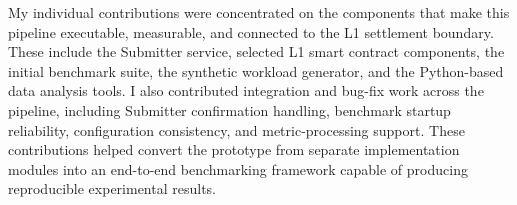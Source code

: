 My individual contributions were concentrated on the components that make this pipeline executable, measurable, and connected to the L1 settlement boundary. These include the Submitter service, selected L1 smart contract components, the initial benchmark suite, the synthetic workload generator, and the Python-based data analysis tools. I also contributed integration and bug-fix work across the pipeline, including Submitter confirmation handling, benchmark startup reliability, configuration consistency, and metric-processing support. These contributions helped convert the prototype from separate implementation modules into an end-to-end benchmarking framework capable of producing reproducible experimental results.

